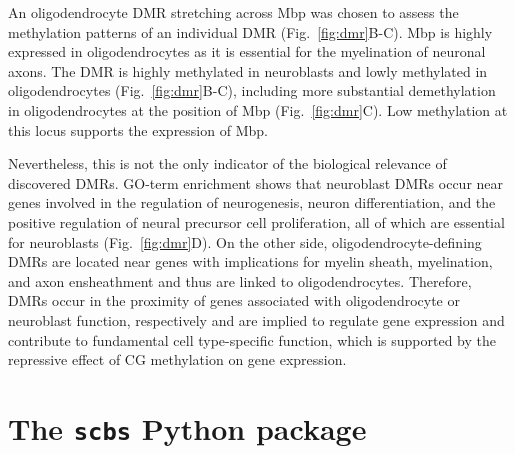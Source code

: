\documentclass[twocolumn,10pt]{article}
\begin{document}
An oligodendrocyte DMR stretching across Mbp was chosen to assess the methylation patterns of an individual DMR (Fig.~\ref{fig:dmr}B-C).
Mbp is highly expressed in oligodendrocytes as it is essential for the myelination of neuronal axons.
The DMR is highly methylated in neuroblasts and lowly methylated in oligodendrocytes (Fig.~\ref{fig:dmr}B-C), including more substantial demethylation in oligodendrocytes at the position of Mbp (Fig.~\ref{fig:dmr}C).
Low methylation at this locus supports the expression of Mbp.


Nevertheless, this is not the only indicator of the biological relevance of discovered DMRs.
GO-term enrichment shows that neuroblast DMRs occur near genes involved in the regulation of neurogenesis, neuron differentiation, and the positive regulation of neural precursor cell proliferation, all of which are essential for neuroblasts (Fig.~\ref{fig:dmr}D).
On the other side, oligodendrocyte-defining DMRs are located near genes with implications for myelin sheath, myelination, and axon ensheathment and thus are linked to oligodendrocytes.
Therefore, DMRs occur in the proximity of genes associated with oligodendrocyte or neuroblast function, respectively and are implied to regulate gene expression and contribute to fundamental cell type-specific function, which is supported by the repressive effect of CG methylation on gene expression.


\section{The \texttt{scbs} Python package}
\end{document}
